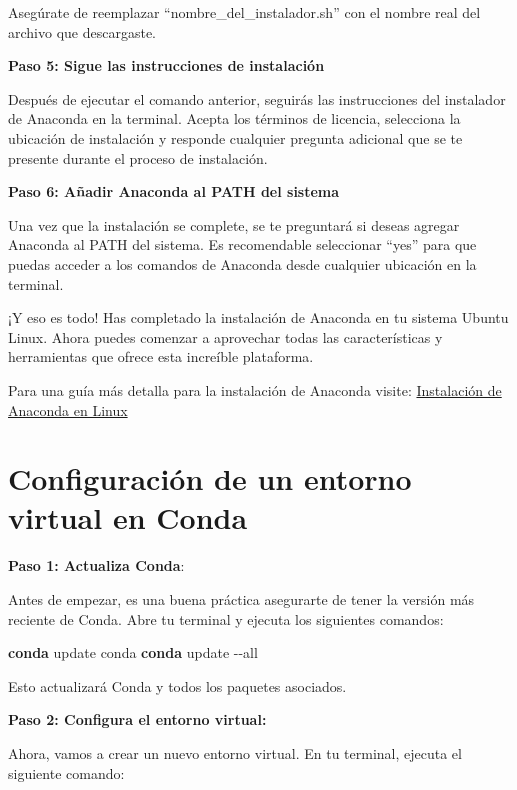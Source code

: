 \documentclass[
  letterpaper,
  DIV=11,
  numbers=noendperiod]{scrartcl}
\newenvironment{Shaded}{}{}
\newcommand{\AttributeTok}[1]{\textcolor[rgb]{0.84,0.23,0.29}{#1}}
\newcommand{\ExtensionTok}[1]{\textcolor[rgb]{0.84,0.23,0.29}{\textbf{#1}}}
\newcommand{\NormalTok}[1]{\textcolor[rgb]{0.14,0.16,0.18}{#1}}
\begin{document}
Asegúrate de reemplazar ``nombre\_del\_instalador.sh'' con el nombre
real del archivo que descargaste.

\textbf{Paso 5: Sigue las instrucciones de instalación}

Después de ejecutar el comando anterior, seguirás las instrucciones del
instalador de Anaconda en la terminal. Acepta los términos de licencia,
selecciona la ubicación de instalación y responde cualquier pregunta
adicional que se te presente durante el proceso de instalación.

\textbf{Paso 6: Añadir Anaconda al PATH del sistema}

Una vez que la instalación se complete, se te preguntará si deseas
agregar Anaconda al PATH del sistema. Es recomendable seleccionar
``yes'' para que puedas acceder a los comandos de Anaconda desde
cualquier ubicación en la terminal.

¡Y eso es todo! Has completado la instalación de Anaconda en tu sistema
Ubuntu Linux. Ahora puedes comenzar a aprovechar todas las
características y herramientas que ofrece esta increíble plataforma.

Para una guía más detalla para la instalación de Anaconda visite:
\href{../2023-06-19-instalacion-de-anaconda/index.qmd}{Instalación de
Anaconda en Linux}

\hypertarget{configuraciuxf3n-de-un-entorno-virtual-en-conda}{%
\section{Configuración de un entorno virtual en
Conda}\label{configuraciuxf3n-de-un-entorno-virtual-en-conda}}

\textbf{Paso 1: Actualiza Conda}:

Antes de empezar, es una buena práctica asegurarte de tener la versión
más reciente de Conda. Abre tu terminal y ejecuta los siguientes
comandos:

\begin{Shaded}
\begin{Highlighting}[]
\ExtensionTok{conda}\NormalTok{ update conda}
\ExtensionTok{conda}\NormalTok{ update }\AttributeTok{{-}{-}all}
\end{Highlighting}
\end{Shaded}

Esto actualizará Conda y todos los paquetes asociados.

\textbf{Paso 2: Configura el entorno virtual:}

Ahora, vamos a crear un nuevo entorno virtual. En tu terminal, ejecuta
el siguiente comando:
\end{document}
